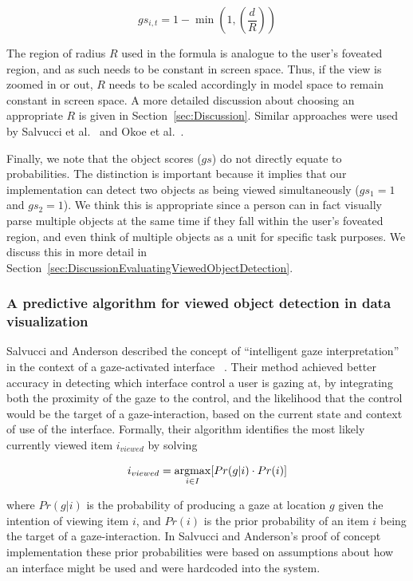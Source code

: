 \begin{equation}
gs_{i,t} = 1 - \min (1, (\frac{d}{R}))
\label{eq:GS}
\end{equation}

The region of radius $R$ used in the formula is analogue to the user's foveated region, and as such needs to be constant in screen space. Thus, if the view is zoomed in or out, $R$ needs to be scaled accordingly in model space to remain constant in screen space.  A more detailed discussion about choosing an appropriate $R$ is given in Section~\ref{sec:Discussion}. Similar approaches were used by Salvucci et al.~\cite{salvucci2000intelligent} and Okoe et al.~\cite{okoe2014gaze}.

Finally, we note that the object scores ($gs$) do not directly equate to probabilities. The distinction is important because it implies that our implementation can detect two objects as being viewed simultaneously ($gs_1 = 1$ and $gs_2=1$). We think this is appropriate since a person can in fact visually parse multiple objects at the same time if they fall within the user's foveated region, and even think of multiple objects as a unit for specific task purposes. We discuss this in more detail in Section~\ref{sec:DiscussionEvaluatingViewedObjectDetection}. 

\subsubsection{A predictive algorithm for viewed object detection in data visualization}
\label{sec:MehthodsIntelligentAlgorithm}
Salvucci and Anderson described the concept of ``intelligent gaze interpretation'' in the context of a gaze-activated interface ~\cite{salvucci2000intelligent}. Their method achieved better accuracy in detecting which interface control a user is gazing at, by integrating both the proximity of the gaze to the control, and the likelihood that the control would be the target of a gaze-interaction, based on the current state and context of use of the interface. Formally, their algorithm identifies the most likely currently viewed item $i_{viewed}$ by solving 

\begin{equation*}
i_{viewed} = \displaystyle \operatorname*{argmax}_{i\in I}[Pr(g|i)\cdot Pr(i)]
\end{equation*}

where $Pr(g|i)$ is the probability of producing a gaze at location $g$ given the intention of viewing item $i$, and $Pr(i)$ is the prior probability of an item $i$  being the target of a gaze-interaction. In Salvucci and Anderson's proof of concept implementation these prior probabilities were based on assumptions about how an interface might be used and were hardcoded into the system.  


